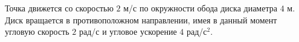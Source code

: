 Точка движется со скоростью $2$ м/с по окружности обода диска диаметра
$4$ м. Диск вращается в противоположном направлении, имея в данный 
момент угловую скорость $2$ рад/с и угловое ускорение $4$ рад/с$^2$.

